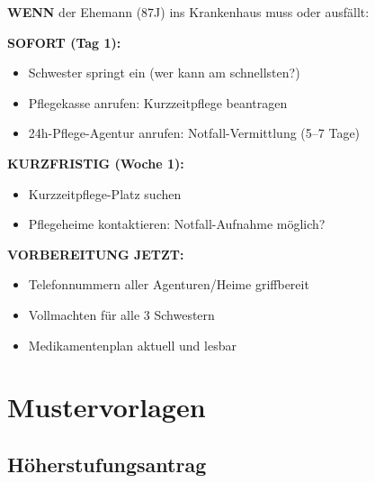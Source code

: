\documentclass[11pt,a4paper]{article}
\begin{document}
\begin{dangerbox}[Notfallplan]
\textbf{WENN} der Ehemann (87J) ins Krankenhaus muss oder ausfällt:

\vspace{0.3cm}
\textbf{SOFORT (Tag 1):}
\begin{itemize}[noitemsep]
    \item[$\square$] Schwester springt ein (wer kann am schnellsten?)
    \item[$\square$] Pflegekasse anrufen: Kurzzeitpflege beantragen
    \item[$\square$] 24h-Pflege-Agentur anrufen: Notfall-Vermittlung (5--7 Tage)
\end{itemize}

\textbf{KURZFRISTIG (Woche 1):}
\begin{itemize}[noitemsep]
    \item[$\square$] Kurzzeitpflege-Platz suchen
    \item[$\square$] Pflegeheime kontaktieren: Notfall-Aufnahme möglich?
\end{itemize}

\textbf{VORBEREITUNG JETZT:}
\begin{itemize}[noitemsep]
    \item[$\square$] Telefonnummern aller Agenturen/Heime griffbereit
    \item[$\square$] Vollmachten für alle 3 Schwestern
    \item[$\square$] Medikamentenplan aktuell und lesbar
\end{itemize}
\end{dangerbox}

\section{Mustervorlagen}

\subsection{Höherstufungsantrag}
\end{document}
